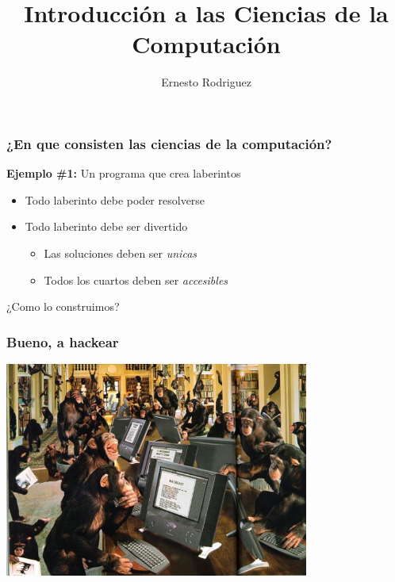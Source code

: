 \documentclass{beamer}
\title[Introducciòn]{Introducci\'on a las Ciencias de la Computaci\'on}
\author{Ernesto Rodriguez}
\institute{
    Universidad del Itsmo \\
    \medskip \textit{erodriguez@unis.edu.gt}
}
\date[\today]{}
\begin{document}
\begin{frame}
\titlepage
\end{frame}

\begin{frame}
\frametitle{¿En que consisten las ciencias de la computaci\'on?}
{\bf Ejemplo \#1:} Un programa que crea laberintos
\begin{itemize}
    \item{Todo laberinto debe poder resolverse}
    \item{Todo laberinto debe ser divertido
    \begin{itemize}
        \item{Las soluciones deben ser \emph{unicas}}
        \item{Todos los cuartos deben ser \emph{accesibles}}
    \end{itemize}
    }
\end{itemize}
¿Como lo construimos?
\end{frame}

\begin{frame}
\frametitle{Bueno, a hackear}
\begin{center}
    \includegraphics[width=10cm]{letshack.png}        
\end{center}
\end{frame}
\end{document}
